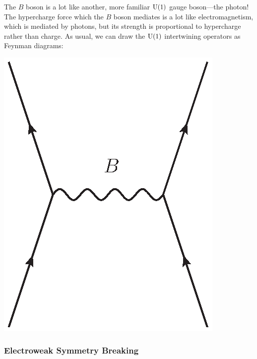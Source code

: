 \documentclass{article}
\newcommand{\U}{{\rm U}}    %
\begin{document}
The $B$ boson is a lot like another, more familiar $\U(1)$ gauge boson---the
photon! The hypercharge force which the $B$ boson mediates is a lot like
electromagnetism, which is mediated by photons, but its strength is
proportional to hypercharge rather than charge.  As usual, we can
draw the $\U(1)$ intertwining operators as Feynman diagrams:
\begin{center}
	\includegraphics[scale=0.5]{B_exchange}
\end{center}

\subsubsection{Electroweak Symmetry Breaking} \label{sec:electroweak}
\end{document}
